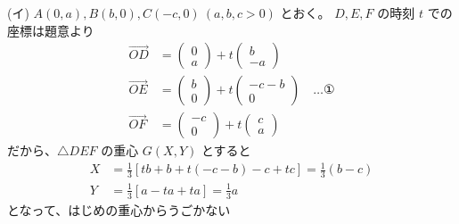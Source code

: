 \documentclass[../main.tex]{subfiles}
\begin{document}
\noindent
[\textbf{解}] (イ) $A(0,a), B(b,0), C(-c,0) \ (a,b,c > 0)$ とおく。 $D,E,F$ の時刻 $t$ での座標は題意より
\begin{align*}
  \vec{OD} &=
  \begin{pmatrix} 0 \\ a
  \end{pmatrix} + t
  \begin{pmatrix} b \\ -a
  \end{pmatrix} \\
  \vec{OE} &=
  \begin{pmatrix} b \\ 0
  \end{pmatrix} + t
  \begin{pmatrix} -c-b \\ 0
  \end{pmatrix} \quad \dots \text{①} \\
  \vec{OF} &=
  \begin{pmatrix} -c \\ 0
  \end{pmatrix} + t
  \begin{pmatrix} c \\ a
  \end{pmatrix}
\end{align*}
だから、$\triangle DEF$ の重心 $G(X,Y)$ とすると
\begin{align*}
  X &= \frac{1}{3} [ tb + b + t(-c-b) - c + tc ] = \frac{1}{3} (b-c) \\
  Y &= \frac{1}{3} [ a - ta + ta ] = \frac{1}{3} a
\end{align*}
となって、はじめの重心からうごかない \quad {}

\vspace{0.5cm}
\end{document}

